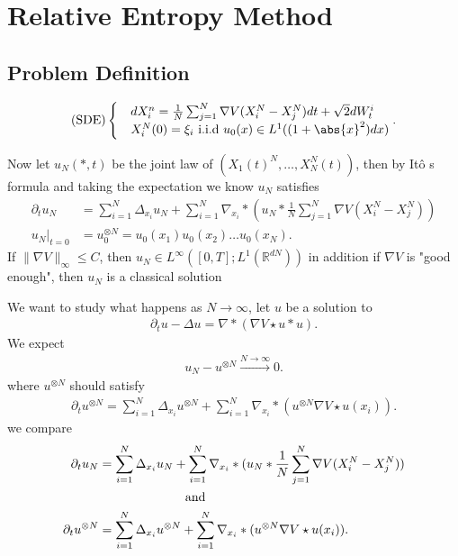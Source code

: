 \chapter{Relative Entropy Method}
\section{Problem Definition}
\begin{Definition}
\begin{align*}
  (\text{SDE})\begin{cases}
    &dX_i^n = \frac{1}{N}\sum_{j=1}^{N} \nabla V (X_i^{N}-X_j^{N}  )  dt + \sqrt{2}dW_t^i\\
    &X_i^N(0) = \xi_i \text{ i.i.d } u_{0}(x) \in L^{1} ((1 + \abs{x}^2) dx) 
  \end{cases}
.\end{align*}  
\end{Definition}
\begin{corollary}
Now let $u_N(*,t)$ be the joint law of $(X_1(t)^{N},\ldots ,X_N^{N}(t)   )$, then by It\^o s formula and taking the expectation we know $u_N$ satisfies
\begin{align*}
  \partial_t u_{N} &= \sum_{i=1}^{N} \Delta_{x_i} u_N + \sum_{i=1}^{N} \nabla_{x_i} * (u_N * \frac{1}{N} \sum_{j=1}^{N} \nabla V (X_i^{N}-X_j^{N}  ))\\
  u_{N}\rvert_{t=0} &= u_0^{\otimes N}  = u_{0}(x_{1})u_{0}(x_{2})\ldots u_0(x_N)
.\end{align*}
If $\|\nabla V\|_{\infty} \le C$, then $u_N \in  L^{\infty}([0,T] ; L^{1}(\mathbb{R}^{dN} ) ) $ in addition if $\nabla V$ is "good enough", then $u_N$ is a classical solution
\end{corollary}
\begin{goal}
We want to study what happens as $N\to \infty$, let $u$ be a solution to 
\begin{align*}
  \partial_t u - \Delta u = \nabla * (\nabla V \star  u * u)
.\end{align*}
We expect 
\begin{align*}
  u_N - u^{\otimes N}  \xrightarrow{N\to \infty} 0 
.\end{align*}
where  $u^{\otimes N} $ should satisfy 
\begin{align*}
  \partial_t u^{\otimes N}  = \sum_{i=1}^{N} \Delta _{x_i}  u^{\otimes N}  + \sum_{i=1}^{N} \nabla_{x_i}  * (u^{\otimes N} \nabla V \star u(x_i) )
.\end{align*}
we compare 
\begin{align*}
  \partial_t u_{N} &= \sum_{i=1}^{N} \Delta_{x_i} u_N + \sum_{i=1}^{N} \nabla_{x_i} * (u_N * \frac{1}{N} \sum_{j=1}^{N} \nabla V (X_i^{N}-X_j^{N}  ))\\ 
                   &\hspace{23mm} \text{ and }\\
\partial_t u^{\otimes N}  &= \sum_{i=1}^{N} \Delta _{x_i}  u^{\otimes N}  + \sum_{i=1}^{N} \nabla_{x_i}  * (u^{\otimes N} \nabla V \star u(x_i) )
.\end{align*}
\end{goal}
